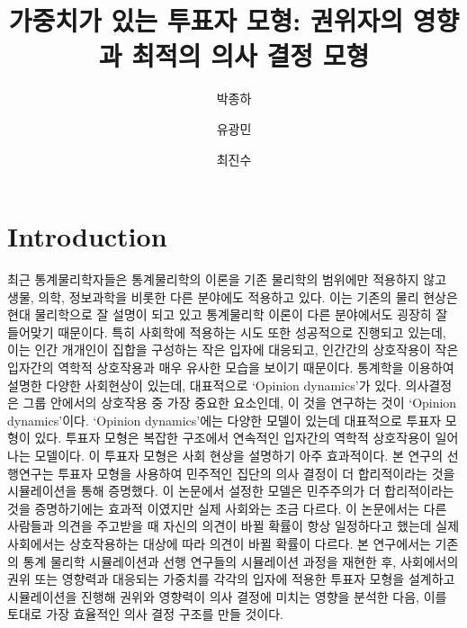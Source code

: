\documentclass{gshs-report-v1.2}
\title{가중치가 있는 투표자 모형: 권위자의 영향과 최적의 의사 결정 모형} %
\author[1] {박종하} %
\author[2] {유광민} %
\author[3] {최진수} %
\newcommand{\gshs}{Gyeonggi Science High School }
\begin{document}
\makecover



\begin{abstractkor}
\end{abstractkor}


\section{Introduction}
최근 통계물리학자들은 통계물리학의 이론을 기존 물리학의 범위에만 적용하지 않고 생물, 의학, 정보과학을 비롯한 다른 분야에도 적용하고 있다. 이는 기존의 물리 현상은 현대 물리학으로 잘 설명이 되고 있고 통계물리학 이론이 다른 분야에서도 굉장히 잘 들어맞기 때문이다. \cite{Stauffer06} 특히 사회학에 적용하는 시도 또한 성공적으로 진행되고 있는데, 이는 인간 개개인이 집합을 구성하는 작은 입자에 대응되고, 인간간의 상호작용이 작은 입자간의 역학적 상호작용과 매우 유사한 모습을 보이기 때문이다.\cite{Stauffer08} 
통계학을 이용하여 설명한 다양한 사회현상이 있는데, 대표적으로 ‘Opinion dynamics’가 있다. 의사결정은 그룹 안에서의 상호작용 중 가장 중요한 요소인데, 이 것을 연구하는 것이 ‘Opinion dynamics’이다.\cite{Hegselmann02} ‘Opinion dynamics’에는 다양한 모델이 있는데 대표적으로 투표자 모형이 있다. 투표자 모형은 복잡한 구조에서 연속적인 입자간의 역학적 상호작용이 일어나는 모델이다. 이 투표자 모형은 사회 현상을 설명하기 아주 효과적이다.\cite{Han10} 본 연구의 선행연구는 투표자 모형을 사용하여 민주적인 집단의 의사 결정이 더 합리적이라는 것을 시뮬레이션을 통해 증명했다. 이 논문에서 설정한 모델은 민주주의가 더 합리적이라는 것을 증명하기에는 효과적 이였지만 실제 사회와는 조금 다르다. 이 논문에서는 다른 사람들과 의견을 주고받을 때 자신의 의견이 바뀔 확률이 항상 일정하다고 했는데 실제 사회에서는 상호작용하는 대상에 따라 의견이 바뀔 확률이 다르다. 본 연구에서는 기존의 통계 물리학 시뮬레이션과 선행 연구들의 시뮬레이션 과정을 재현한 후, 사회에서의 권위 또는 영향력과 대응되는 가중치를 각각의 입자에 적용한 투표자 모형을 설계하고 시뮬레이션을 진행해 권위와 영향력이 의사 결정에 미치는 영향을 분석한 다음, 이를 토대로 가장 효율적인 의사 결정 구조를 만들 것이다.
\end{document}
